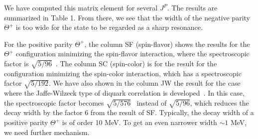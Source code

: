 \documentclass{annurep}
\newcommand{\ket}{\rangle}
\newcommand{\bra}{\langle}
\newcommand{\Thep}{\Theta^+}
\begin{document}
We have computed this matrix element for several $J^P$.  
The results are summarized in Table 1.  
From there, we see that the width of the negative 
parity $\Thep$ is too wide for the state to be regarded as 
a sharp resonance.    

For the positive parity $\Thep$, the column SF (spin-flavor) 
shows the results for the $\Thep$ configuration minimizing 
the spin-flavor interaction, where the spectroscopic factor 
is $\sqrt{5/96}$~\cite{Carlson:2003xb}.  
The column SC (spin-color) is for the result for the 
configuration minimizing the spin-color interaction, which  
has a spectroscopic factor $\sqrt{5/192}$.  
We have also shown in the column JW the result for the 
case where the Jaffe-Wilzeck type of diquark correlation 
is developed~\cite{Jaffe:2003sg}.  
In this case, the spectroscopic factor becomes 
$\sqrt{5/576}$~\cite{Carlson:2003xb}
instead of $\sqrt{5/96}$, which reduces the decay width 
by the factor 6 from the result of SF. 
Typically, the decay width of a positive parity $\Thep$ is 
of order 10 MeV.  
To get an even narrower width $\sim 1$ MeV, we need further mechanism.  




\end{document}
